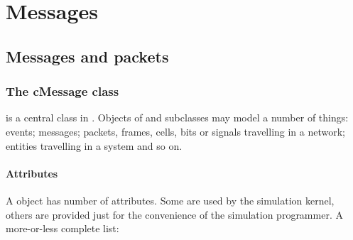 \chapter{Messages}
\label{cha:messages}

\section{Messages and packets}

\subsection{The cMessage class}

 is a central class in {\opp}. Objects of  and
subclasses may model a number of things: events;
messages; packets,
frames, cells, bits or signals travelling
in a network; entities travelling in a system and so on.


\subsubsection{Attributes}


A  object has number of attributes. Some are used by
the simulation kernel, others are provided just for the convenience
of the simulation programmer. A more-or-less complete list:

